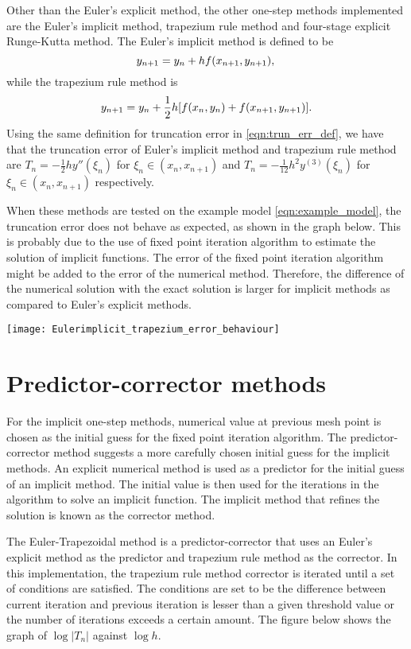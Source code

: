 Other than the Euler's explicit method, the other one-step methods implemented are the Euler's implicit method, trapezium rule method and four-stage explicit Runge-Kutta method. The Euler's implicit method is defined to be
\begin{equation}
    y_{n+1} = y_n + hf(x_{n+1},y_{n+1}),\\
\end{equation}
while the trapezium rule method is
\begin{equation}
    y_{n+1} = y_n + \frac{1}{2}h[f(x_n,y_n) + f(x_{n+1},y_{n+1})].\\
\end{equation}
Using the same definition for truncation error in \ref{eqn:trun_err_def}, we have that the truncation error of Euler's implicit method and trapezium rule method are $T_n = -\frac{1}{2}hy''(\xi_n)$ for $\xi_n \in (x_n, x_{n+1})$ and $T_n = -\frac{1}{12}h^2y^{(3)}(\xi_n)$ for $\xi_n \in (x_n, x_{n+1})$ respectively.

When these methods are tested on the example model \ref{eqn:example_model}, the truncation error does not behave as expected, as shown in the graph below. This is probably due to the use of fixed point iteration algorithm to estimate the solution of implicit functions. The error of the fixed point iteration algorithm might be added to the error of the numerical method. Therefore, the difference of the numerical solution with the exact solution is larger for implicit methods as compared to Euler's explicit methods.

\texttt{[image: Eulerimplicit\_trapezium\_error\_behaviour]}

\section{Predictor-corrector methods}
For the implicit one-step methods, numerical value at previous mesh point is chosen as the initial guess for the fixed point iteration algorithm. The predictor-corrector method suggests a more carefully chosen initial guess for the implicit methods. An explicit numerical method is used as a predictor for the initial guess of an implicit method. The initial value is then used for the iterations in the algorithm to solve an implicit function. The implicit method that refines the solution is known as the corrector method. 

The Euler-Trapezoidal method is a predictor-corrector that uses an Euler's explicit method as the predictor and trapezium rule method as the corrector. In this implementation, the trapezium rule method corrector is iterated until a set of conditions are satisfied. The conditions are set to be the difference between current iteration and previous iteration is lesser than a given threshold value or the number of iterations exceeds a certain amount. The figure below shows the graph of $\log |T_n|$ against $\log h$.

